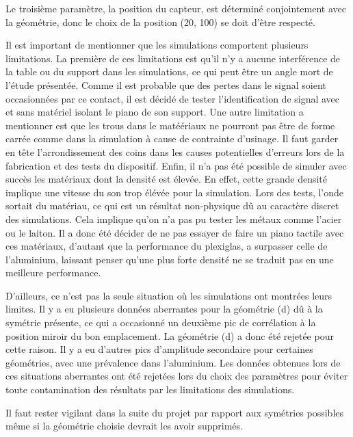 \documentclass[conference]{IEEEtran}
\begin{document}
Le troisième paramètre, la position du capteur, est déterminé conjointement avec 
la géométrie, donc le choix de la position (20, 100) se doit d'être respecté. 

Il est important de mentionner que les simulations comportent plusieurs limitations.
La première de ces limitations est qu'il n'y a aucune interférence de la table ou 
du support dans les simulations, ce qui peut être un angle mort de l'étude présentée.
Comme il est probable que des pertes dans le signal soient occasionnées par ce
contact, il est décidé de tester l'identification de signal avec et sans matériel 
isolant le piano de son support. Une autre limitation a mentionner est que les trous
dans le matéériaux ne pourront pas être de forme carrée comme dans la simulation à 
cause de contrainte d'usinage. Il faut garder en tête l'arrondissement des coins dans
les causes potentielles d'erreurs lors de la fabrication et des tests du dispositif.
Enfin, il n'a pas été possible de simuler avec succès les matériaux dont la densité
est élevée. En effet, cette grande densité implique une vitesse du son trop élévée
pour la simulation. Lors des tests, l'onde sortait du matériau, ce qui est un résultat
non-physique dû au caractère discret des simulations. Cela implique qu'on n'a pas pu 
tester les métaux comme l'acier ou le laiton. Il a donc été décider de ne pas essayer
de faire un piano tactile avec ces matériaux, d'autant que la performance du plexiglas,
a surpasser celle de l'aluminium, laissant penser qu'une plus forte densité ne se 
traduit pas en une meilleure performance.

D'ailleurs, ce n'est pas la seule situation où les simulations ont montrées leurs 
limites. Il y a eu plusieurs données aberrantes pour la géométrie (d) dû à la symétrie 
présente, ce qui a occasionné un deuxième pic de corrélation à la position miroir du
bon emplacement. La géométrie (d) a donc été rejetée pour cette raison. Il y a eu 
d'autres pics d'amplitude secondaire pour certaines géométries, avec une prévalence 
dans l'aluminium. Les données obtenues lors de ces situations aberrantes ont été 
rejetées lors du choix des paramètres pour éviter toute contamination des résultats 
par les limitations des simulations.

Il faut rester vigilant dans la suite du projet par rapport aux symétries possibles 
même si la géométrie choisie devrait les avoir supprimés. 

\clearpage

% 
% 
\end{document}

